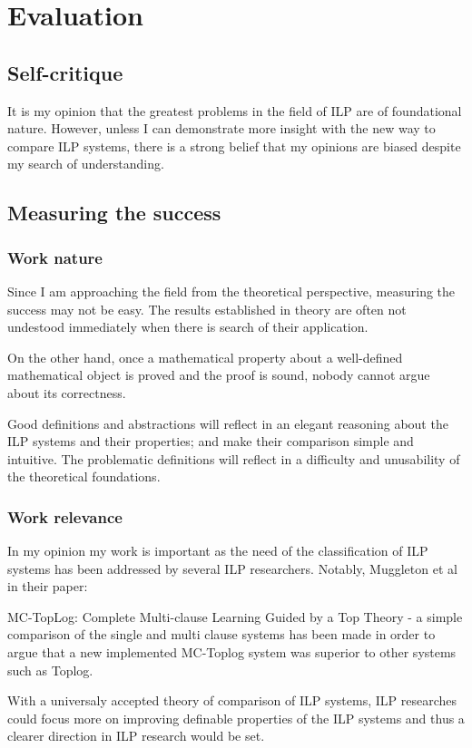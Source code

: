 \chapter{Evaluation}

\section{Self-critique}
It is my opinion that the greatest problems in the field of ILP are of foundational nature. However, unless I can demonstrate more insight with the new way to compare ILP systems, there is a strong belief that my opinions are biased despite my search of understanding.
\section{Measuring the success}

\subsection{Work nature}
Since I am approaching the field from the theoretical perspective, measuring the success may not be easy. The results established in theory are often not undestood immediately when there is search of their application.

On the other hand, once a mathematical property about a well-defined mathematical object is proved and the proof is sound, nobody cannot argue about its correctness.

Good definitions and abstractions will reflect in an elegant reasoning about the ILP systems and their properties; and make their comparison simple and intuitive. The problematic definitions will reflect in a difficulty and unusability of the theoretical foundations.

\subsection{Work relevance}
In my opinion my work is important as the need of the classification of ILP systems has been addressed by several ILP researchers. Notably, Muggleton et al in their paper:

MC-TopLog: Complete Multi-clause Learning Guided by a Top Theory - a simple comparison of the single and multi clause systems has been made in order to argue that a new implemented MC-Toplog system was superior to other systems such as Toplog.

With a universaly accepted theory of comparison of ILP systems, ILP researches could focus more on improving definable properties of the ILP systems and thus a clearer direction in ILP research would be set.

